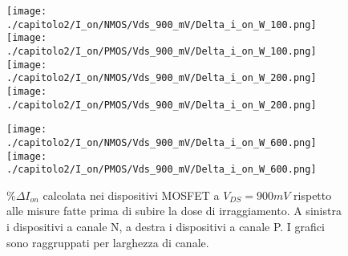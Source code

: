 \begin{figure}[h]
    \centering
    \texttt{[image: ./capitolo2/I\_on/NMOS/Vds\_900\_mV/Delta\_i\_on\_W\_100.png]}
    \texttt{[image: ./capitolo2/I\_on/PMOS/Vds\_900\_mV/Delta\_i\_on\_W\_100.png]}\\
    \vspace{0.2cm}
    \texttt{[image: ./capitolo2/I\_on/NMOS/Vds\_900\_mV/Delta\_i\_on\_W\_200.png]}
    \texttt{[image: ./capitolo2/I\_on/PMOS/Vds\_900\_mV/Delta\_i\_on\_W\_200.png]}\\
    \vspace{0.2cm}

    \texttt{[image: ./capitolo2/I\_on/NMOS/Vds\_900\_mV/Delta\_i\_on\_W\_600.png]}
    \texttt{[image: ./capitolo2/I\_on/PMOS/Vds\_900\_mV/Delta\_i\_on\_W\_600.png]}

    \caption[Dati $\% \Delta I_{on}$ a $V_{DS}=440mV$ ]{$\% \Delta I_{on}$ calcolata nei dispositivi MOSFET a $V_{DS} = 900mV$ rispetto alle misure fatte prima di subire la dose di irraggiamento. A sinistra i dispositivi a canale N, a destra i dispositivi a canale P. I grafici sono raggruppati per larghezza di canale.}
    \label{fig:delta_I_on_vds_900_mv}

\end{figure}


